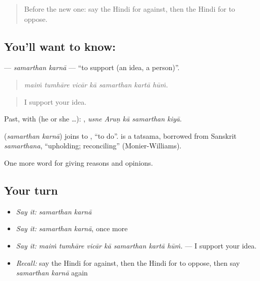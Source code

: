 \label{lesson:HI-C347-samarthankarna}



\begin{quote}
Before the new one: say the Hindi for against, then the Hindi for to oppose.
\end{quote}

\subsection*{You'll want to know:  }
\textbf{ } — \emph{samarthan karnā} — \textquotedblleft{}to support (an idea, a person)\textquotedblright{}.

\begin{quote}
      
\end{quote}

\begin{quote}
\emph{maiṁ tumhāre vicār kā samarthan kartā hūṁ.}
\end{quote}

\begin{quote}
I support your idea.
\end{quote}

Past, with  (he or she …):     , \emph{usne Aruṇ kā samarthan kiyā}.

\begin{cousinweb}
\textbf{ } (\emph{samarthan karnā}) joins  to , \textquotedblleft{}to do\textquotedblright{}.  is a tatsama, borrowed from Sanskrit \emph{samarthana}, \textquotedblleft{}upholding; reconciling\textquotedblright{} (Monier-Williams).
\end{cousinweb}

\begin{grammarlens}[title={What you've built}]
One more word for giving reasons and opinions.
\end{grammarlens}

\subsection*{Your turn}
\begin{itemize}
\raggedright
  \item \emph{Say it:} \emph{samarthan karnā}
  \item \emph{Say it:} \emph{samarthan karnā}, once more
  \item \emph{Say it:} \emph{maiṁ tumhāre vicār kā samarthan kartā hūṁ.} — I support your idea.
  \item \emph{Recall:} say the Hindi for against, then the Hindi for to oppose, then say \emph{samarthan karnā} again
\end{itemize}

